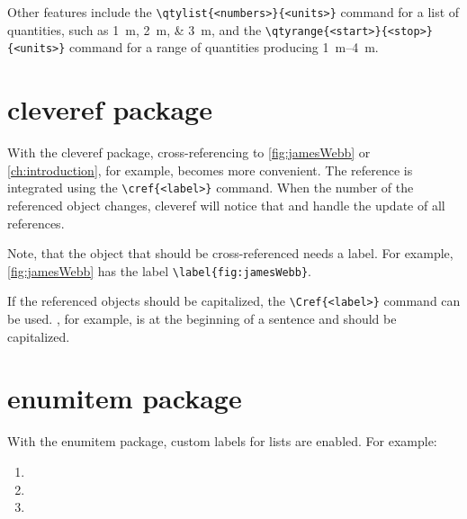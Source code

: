 Other features include the \verb|\qtylist{<numbers>}{<units>}| command for a list of quantities, such as \qtylist{1; 2; 3}{\meter}, and the \verb|\qtyrange{<start>}{<stop>}{<units>}| command for a range of quantities producing \qtyrange{1}{4}{\meter}.
%
\section{cleveref package}%
\label{sec:cleveref}
With the cleveref package, cross-referencing to \cref{fig:jamesWebb} or \cref{ch:introduction}, for example, becomes more convenient. The reference is integrated using the \verb|\cref{<label>}| command. When the number of the referenced object changes, cleveref will notice that and handle the update of all references. 

Note, that the object that should be cross-referenced needs a label. For example, \cref{fig:jamesWebb} has the label \verb|\label{fig:jamesWebb}|.

If the referenced objects should be capitalized, the \verb|\Cref{<label>}| command can be used. , for example, is at the beginning of a sentence and should be capitalized. 
%
\section{enumitem package}%
\label{sec:enumitem}
With the enumitem package, custom labels for lists are enabled. For example:
\begin{enumerate}[leftmargin=*, align=left,start=1,label={\bfseries L\arabic*}]%
	\item \lipsum[0-1]
	\item \lipsum[0-1]
	\item \lipsum[0-1]
\end{enumerate}